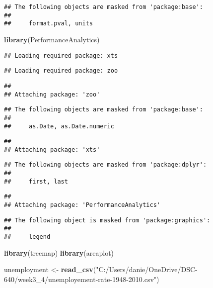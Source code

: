 \documentclass[
]{article}
\newenvironment{Shaded}{\begin{snugshade}}{\end{snugshade}}
\newcommand{\KeywordTok}[1]{\textcolor[rgb]{0.13,0.29,0.53}{\textbf{#1}}}
\newcommand{\NormalTok}[1]{#1}
\newcommand{\StringTok}[1]{\textcolor[rgb]{0.31,0.60,0.02}{#1}}
\begin{document}
\begin{verbatim}
## The following objects are masked from 'package:base':
## 
##     format.pval, units
\end{verbatim}

\begin{Shaded}
\begin{Highlighting}[]
\KeywordTok{library}\NormalTok{(PerformanceAnalytics)}
\end{Highlighting}
\end{Shaded}

\begin{verbatim}
## Loading required package: xts
\end{verbatim}

\begin{verbatim}
## Loading required package: zoo
\end{verbatim}

\begin{verbatim}
## 
## Attaching package: 'zoo'
\end{verbatim}

\begin{verbatim}
## The following objects are masked from 'package:base':
## 
##     as.Date, as.Date.numeric
\end{verbatim}

\begin{verbatim}
## 
## Attaching package: 'xts'
\end{verbatim}

\begin{verbatim}
## The following objects are masked from 'package:dplyr':
## 
##     first, last
\end{verbatim}

\begin{verbatim}
## 
## Attaching package: 'PerformanceAnalytics'
\end{verbatim}

\begin{verbatim}
## The following object is masked from 'package:graphics':
## 
##     legend
\end{verbatim}

\begin{Shaded}
\begin{Highlighting}[]
\KeywordTok{library}\NormalTok{(treemap)}
\KeywordTok{library}\NormalTok{(areaplot)}

\NormalTok{unemployment <-}\StringTok{ }\KeywordTok{read_csv}\NormalTok{(}\StringTok{"C:/Users/danie/OneDrive/DSC-640/week3_4/unemployement-rate-1948-2010.csv"}\NormalTok{)}
\end{Highlighting}
\end{Shaded}
\end{document}
